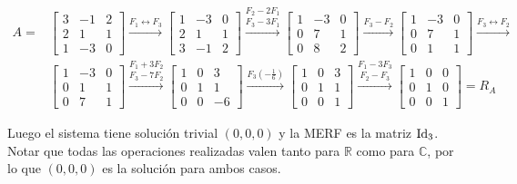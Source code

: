 \begin{enumerate}[topsep=6pt, itemsep=.4cm]
\begin{enumerate}
\begin{align*}
A = &\begin{bmatrix}3 & -1 & 2 \\2 & 1 & 1 \\1&-3&0\end{bmatrix}
\stackrel{F_1 \leftrightarrow F_3}{\longrightarrow}
\begin{bmatrix}1&-3&0\\2 & 1 & 1 \\3 & -1 & 2 \end{bmatrix}
\stackrel{F_2 - 2 F_1}{\stackrel{F_3 - 3 F_1}{\longrightarrow}}
\begin{bmatrix} 1 & -3 & 0 \\ 0 & 7 & 1 \\ 0 & 8 & 2 \end{bmatrix}
\stackrel{F_3-F_2}{\longrightarrow}
\begin{bmatrix} 1 & -3 & 0 \\ 0 & 7 & 1 \\ 0 & 1 & 1 \end{bmatrix}
\stackrel{F_3 \leftrightarrow F_2}{\longrightarrow} \\
&\begin{bmatrix} 1 & -3 & 0 \\ 0 & 1 & 1 \\ 0 & 7 & 1 \end{bmatrix}
\stackrel{F_1 + 3 F_2}{\stackrel{F_3-7F_2}{\longrightarrow}}
\begin{bmatrix} 1 & 0 & 3 \\ 0 & 1 & 1 \\ 0 & 0 & -6 \end{bmatrix}
\stackrel{F_3 (-\frac{1}{6}) }{\longrightarrow}
\begin{bmatrix} 1 & 0 & 3 \\ 0 & 1 & 1 \\ 0 & 0 & 1 \end{bmatrix}
\stackrel{F_1 - 3 F_3}{\stackrel{F_2 - F_3 }{\longrightarrow}}
\begin{bmatrix} 1 & 0 & 0 \\ 0 & 1 & 0 \\ 0 & 0 & 1 \end{bmatrix} = R_A
\end{align*}

Luego el sistema tiene solución trivial $(0,0,0)$ y la MERF es la matriz $\operatorname{Id}_3$. Notar que todas las operaciones realizadas valen tanto para $\mathbb{R}$ como para $\mathbb{C}$, por lo que $(0,0,0)$ es la solución para ambos casos.


\end{enumerate}
\end{enumerate}
